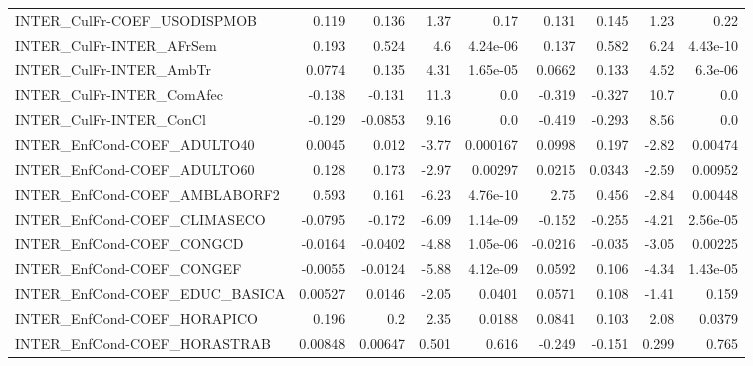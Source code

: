 \begin{tabular}{lrrrrrrrr}
INTER\_CulFr-COEF\_USODISPMOB           &       0.119 &        0.136 &     1.37 &     0.17 &      0.131 &       0.145 &         1.23 &          0.22 \\
INTER\_CulFr-INTER\_AFrSem              &       0.193 &        0.524 &      4.6 & 4.24e-06 &      0.137 &       0.582 &         6.24 &      4.43e-10 \\
INTER\_CulFr-INTER\_AmbTr               &      0.0774 &        0.135 &     4.31 & 1.65e-05 &     0.0662 &       0.133 &         4.52 &       6.3e-06 \\
INTER\_CulFr-INTER\_ComAfec             &      -0.138 &       -0.131 &     11.3 &      0.0 &     -0.319 &      -0.327 &         10.7 &           0.0 \\
INTER\_CulFr-INTER\_ConCl               &      -0.129 &      -0.0853 &     9.16 &      0.0 &     -0.419 &      -0.293 &         8.56 &           0.0 \\
INTER\_EnfCond-COEF\_ADULTO40           &      0.0045 &        0.012 &    -3.77 & 0.000167 &     0.0998 &       0.197 &        -2.82 &       0.00474 \\
INTER\_EnfCond-COEF\_ADULTO60           &       0.128 &        0.173 &    -2.97 &  0.00297 &     0.0215 &      0.0343 &        -2.59 &       0.00952 \\
INTER\_EnfCond-COEF\_AMBLABORF2         &       0.593 &        0.161 &    -6.23 & 4.76e-10 &       2.75 &       0.456 &        -2.84 &       0.00448 \\
INTER\_EnfCond-COEF\_CLIMASECO          &     -0.0795 &       -0.172 &    -6.09 & 1.14e-09 &     -0.152 &      -0.255 &        -4.21 &      2.56e-05 \\
INTER\_EnfCond-COEF\_CONGCD             &     -0.0164 &      -0.0402 &    -4.88 & 1.05e-06 &    -0.0216 &      -0.035 &        -3.05 &       0.00225 \\
INTER\_EnfCond-COEF\_CONGEF             &     -0.0055 &      -0.0124 &    -5.88 & 4.12e-09 &     0.0592 &       0.106 &        -4.34 &      1.43e-05 \\
INTER\_EnfCond-COEF\_EDUC\_BASICA        &     0.00527 &       0.0146 &    -2.05 &   0.0401 &     0.0571 &       0.108 &        -1.41 &         0.159 \\
INTER\_EnfCond-COEF\_HORAPICO           &       0.196 &          0.2 &     2.35 &   0.0188 &     0.0841 &       0.103 &         2.08 &        0.0379 \\
INTER\_EnfCond-COEF\_HORASTRAB          &     0.00848 &      0.00647 &    0.501 &    0.616 &     -0.249 &      -0.151 &        0.299 &         0.765 \\

\end{tabular}
